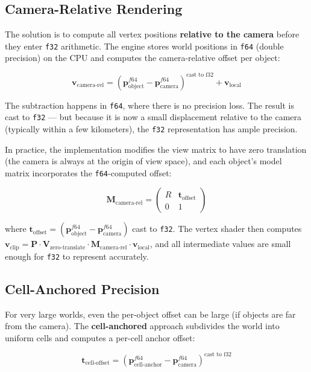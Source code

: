 \documentclass[
  11pt,
  letterpaper,
  DIV=11,
  numbers=noendperiod,
  twoside,
  open=right]{scrreprt}
\begin{document}
\subsection{Camera-Relative Rendering}\label{camera-relative-rendering}

The solution is to compute all vertex positions \textbf{relative to the
camera} before they enter \texttt{f32} arithmetic. The engine stores
world positions in \texttt{f64} (double precision) on the CPU and
computes the camera-relative offset per object:

\[
\mathbf{v}_{\text{camera-rel}} = (\mathbf{p}_{\text{object}}^{f64} - \mathbf{p}_{\text{camera}}^{f64})^{\text{cast to f32}} + \mathbf{v}_{\text{local}}
\]

The subtraction happens in \texttt{f64}, where there is no precision
loss. The result is cast to \texttt{f32} --- but because it is now a
small displacement relative to the camera (typically within a few
kilometers), the \texttt{f32} representation has ample precision.

In practice, the implementation modifies the view matrix to have zero
translation (the camera is always at the origin of view space), and each
object's model matrix incorporates the \texttt{f64}-computed offset:

\[
\mathbf{M}_{\text{camera-rel}} = \begin{pmatrix}
  R & \mathbf{t}_{\text{offset}} \\
  0 & 1
\end{pmatrix}
\]

where
\(\mathbf{t}_{\text{offset}} = (\mathbf{p}_{\text{object}}^{f64} - \mathbf{p}_{\text{camera}}^{f64})\)
cast to \texttt{f32}. The vertex shader then computes
\(\mathbf{v}_{\text{clip}} = \mathbf{P} \cdot \mathbf{V}_{\text{zero-translate}} \cdot \mathbf{M}_{\text{camera-rel}} \cdot \mathbf{v}_{\text{local}}\),
and all intermediate values are small enough for \texttt{f32} to
represent accurately.

\subsection{Cell-Anchored Precision}\label{cell-anchored-precision}

For very large worlds, even the per-object offset can be large (if
objects are far from the camera). The \textbf{cell-anchored} approach
subdivides the world into uniform cells and computes a per-cell anchor
offset:

\[
\mathbf{t}_{\text{cell-offset}} = (\mathbf{p}_{\text{cell-anchor}}^{f64} - \mathbf{p}_{\text{camera}}^{f64})^{\text{cast to f32}}
\]
\end{document}
